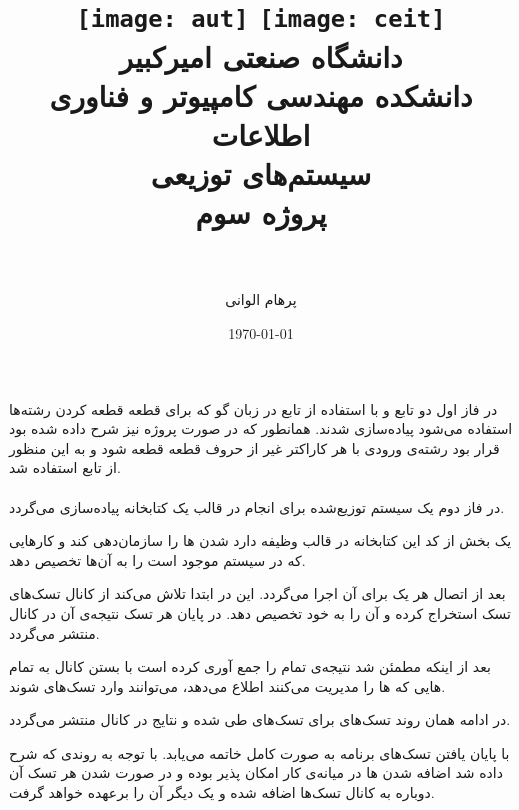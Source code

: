\documentclass[paper=a4, fontsize=11pt]{article}
\title{
\normalfont\normalsize
\texttt{[image: aut]}
\hspace{5cm}
\texttt{[image: ceit]} \\
\textsc دانشگاه صنعتی امیرکبیر \\
\textsc دانشکده مهندسی کامپیوتر و فناوری اطلاعات
\horrule{0.5pt} \\ [0.4cm] %
\huge سیستم‌های توزیعی \\ %
\huge پروژه سوم \\ %
\horrule{2pt} \\ [0.5cm] %
}
\author{پرهام الوانی}
\date{\normalsize\today} %
\numberwithin{equation}{section} %
\numberwithin{figure}{section} %
\numberwithin{table}{section} %
\begin{document}
\maketitle %

\paragraph{}
در فاز اول دو تابع  و 
با استفاده از تابع  در زبان گو
که برای قطعه قطعه کردن رشته‌ها استفاده می‌شود پیاده‌سازی شدند.
همانطور که در صورت پروژه نیز شرح داده شده بود قرار بود رشته‌ی ورودی
با هر کاراکتر غیر از حروف قطعه قطعه شود و
به این منظور از تابع  استفاده شد.

\paragraph{}
در فاز دوم یک سیستم توزیع‌شده برای انجام 
در قالب یک کتابخانه پیاده‌سازی می‌گردد.

یک بخش از کد این کتابخانه در قالب 
وظیفه دارد  شدن
ها
را سازمان‌دهی کند و کارهایی که در سیستم موجود است را به آن‌ها تخصیص دهد.

بعد از اتصال هر  یک 
برای آن اجرا می‌گردد. این 
در ابتدا تلاش می‌کند از کانال تسک‌های 
تسک استخراج کرده و آن را به 
خود تخصیص دهد. در پایان هر تسک نتیجه‌ی آن
در کانال  منتشر می‌گردد.

بعد از اینکه  مطمئن شد نتیجه‌ی تمام 
را جمع آوری کرده است با بستن کانال 
به تمام هایی
که ها را مدیریت می‌کنند
اطلاع می‌دهد، می‌توانند وارد تسک‌های  شوند.

در ادامه همان روند تسک‌های  برای تسک‌های 
طی شده و نتایج در کانال  منتشر می‌گردد.

با پایان یافتن تسک‌های  برنامه به صورت کامل خاتمه می‌یابد.
با توجه به روندی که شرح داده شد اضافه شدن ها در میانه‌ی کار
امکان پذیر بوده و در صورت  شدن هر 
تسک آن دوباره به کانال تسک‌ها اضافه شده و یک 
دیگر آن را برعهده خواهد گرفت.
\end{document}

